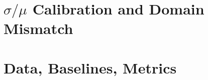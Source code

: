 \section{$\sigma/\mu$ Calibration and Domain Mismatch}
\label{sec:calibration}




\section{Data, Baselines, Metrics}
\label{sec:data-baselines}

%
%
%
